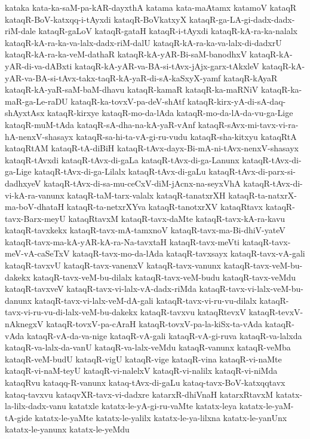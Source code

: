 {kataka
kata-ka-saM-pa-kAR-dayxthA
katama
kata-maAtamx
katamoV
kataqR
kataqR-BoV-katxqq-i-tAyxdi
kataqR-BoVkatxyX
kataqR-ga-LA-gi-dadx-dadx-riM-dale
kataqR-gaLoV
kataqR-gataH
kataqR-i-tAyxdi
kataqR-kA-ra-ka-nalalx
kataqR-kA-ra-ka-va-lalx-dadx-riM-dalU
kataqR-kA-ra-ka-va-lalx-di-dadxrU
kataqR-kA-ra-ka-veM-dathaR
kataqR-kA-yAR-Bi-saM-banodhxV
kataqR-kA-yAR-di-va-dABxti
kataqR-kA-yAR-va-BA-si-tAvx-jAjx-garx-tAkxleV
kataqR-kA-yAR-va-BA-si-tAvx-takx-taqR-kA-yaR-di-sA-kaSxyX-yamf
kataqR-kAyaR
kataqR-kA-yaR-saM-baM-dhavu
kataqR-kamaR
kataqR-ka-maRNiV
kataqR-ka-maR-ga-Le-raDU
kataqR-ka-tovxV-pa-deV-shAtf
kataqR-kirx-yA-di-sA-daq-shAyxtAsx
kataqR-kirxye
kataqR-mo-da-lAda
kataqR-mo-da-lA-da-vu-ga-Lige
kataqR-muM-tAda
kataqR-sA-dha-na-kA-yaR-vAnf
kataqR-sAvx-mi-tavx-vi-ra-hA-nenxV-shasayx
kataqR-sa-hi-ta-vA-gi-ru-vudu
kataqR-sha-kitxyu
kataqRtA
kataqRtAM
kataqR-tA-diBiH
kataqR-tAvx-dayx-Bi-mA-ni-tAvx-nenxV-shasayx
kataqR-tAvxdi
kataqR-tAvx-di-gaLa
kataqR-tAvx-di-ga-Lanunx
kataqR-tAvx-di-ga-Lige
kataqR-tAvx-di-ga-Lilalx
kataqR-tAvx-di-gaLu
kataqR-tAvx-di-parx-si-dadhxyeV
kataqR-tAvx-di-sa-mu-ceCxV-diM-jAcnx-na-seyxVhA
kataqR-tAvx-di-vi-kA-ra-vanunx
kataqR-taM-tarx-valalx
kataqR-tanatxrXH
kataqR-ta-natxrX-ma-boV-dhataH
kataqR-ta-netxrXYva
kataqR-tanotxrXV
kataqRtavx
kataqR-tavx-Barx-meyU
kataqRtavxM
kataqR-tavx-daMte
kataqR-tavx-kA-ra-kavu
kataqR-tavxkekx
kataqR-tavx-mA-tamxnoV
kataqR-tavx-ma-Bi-dhiV-yateV
kataqR-tavx-ma-kA-yAR-kA-ra-Na-tavxtaH
kataqR-tavx-meVti
kataqR-tavx-meV-vA-caSeTxV
kataqR-tavx-mo-da-lAda
kataqR-tavxsayx
kataqR-tavx-vA-gali
kataqR-tavxvU
kataqR-tavx-vanenxV
kataqR-tavx-vanunx
kataqR-tavx-veM-bu-dakekx
kataqR-tavx-veM-bu-dilalx
kataqR-tavx-veM-budu
kataqR-tavx-veMdu
kataqR-tavxveV
kataqR-tavx-vi-lalx-vA-dadx-riMda
kataqR-tavx-vi-lalx-veM-bu-danunx
kataqR-tavx-vi-lalx-veM-dA-gali
kataqR-tavx-vi-ru-vu-dilalx
kataqR-tavx-vi-ru-vu-di-lalx-veM-bu-dakekx
kataqR-tavxvu
kataqRtevxV
kataqR-tevxV-nAknegxV
kataqR-tovxV-pa-cAraH
kataqR-tovxV-pa-la-kiSx-ta-vAda
kataqR-vAda
kataqR-vA-da-va-nige
kataqR-vA-gali
kataqR-vA-gi-ruva
kataqR-va-lalxda
kataqR-va-lalx-da-vanU
kataqR-va-lalx-veMdu
kataqR-vanunx
kataqR-veMba
kataqR-veM-budU
kataqR-vigU
kataqR-vige
kataqR-vina
kataqR-vi-naMte
kataqR-vi-naM-teyU
kataqR-vi-nalelxV
kataqR-vi-nalilx
kataqR-vi-niMda
kataqRvu
kataqq-R-vanunx
kataq-tAvx-di-gaLu
kataq-tavx-BoV-katxqqtavx
kataq-tavxvu
kataqvXR-tavx-vi-dadxre
katarxR-dhiVnaH
katarxRtavxM
katatx-la-lilx-dadx-vanu
katatxle
katatx-le-yA-gi-ru-vaMte
katatx-leya
katatx-le-yaM-tA-gide
katatx-le-yaMte
katatx-le-yalilx
katatx-le-ya-lilxna
katatx-le-yanUnx
katatx-le-yanunx
katatx-le-yeMdu
}
